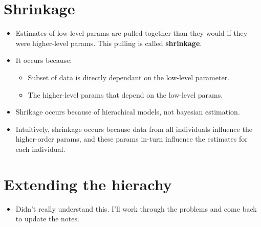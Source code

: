\documentclass{article}
\begin{document}
    \section{Shrinkage}
    \begin{itemize}
        \item Estimates of low-level params are pulled together than they would if they were higher-level params. This pulling is called \textbf{shrinkage}.
        \item It occurs because:
            \begin{itemize}
                \item Subset of data is directly dependant on the low-level parameter.
                \item The higher-level params that depend on the low-level params.
            \end{itemize}
        \item Shrikage occurs because of hierachical models, not bayesian estimation.
        \item Intuitively, shrinkage occurs because data from all individuals influence the higher-order params, and these params in-turn influence the estimates for each individual.
    \end{itemize}
    \section{Extending the hierachy}
    \begin{itemize}
        \item Didn't really understand this. I'll work through the problems and come back to update the notes.
    \end{itemize}
\end{document}
